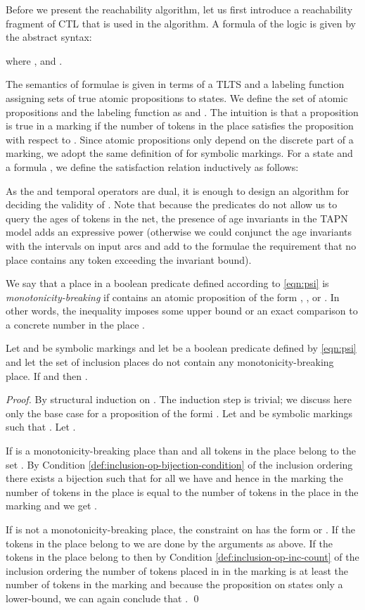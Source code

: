 Before we present the reachability algorithm, let us first introduce a reachability fragment of CTL that is used in the algorithm. A formula of the logic is given by the abstract syntax: 

where ,  and
.

The semantics of formulae is given in terms of a TLTS  and a labeling function  assigning sets of true atomic propositions to states. We define the set of atomic propositions  and the labeling function  as  and . The intuition is that a proposition  is true in a marking  if the number of tokens in the place  satisfies the proposition with respect to . Since atomic propositions only depend on the discrete part of a marking, we adopt the same definition of  for symbolic markings. For a state  and a formula , we define the satisfaction relation  inductively as follows:




As the  and  temporal operators are dual, it is enough to
design an algorithm for deciding the validity of .
Note that because the predicates do not allow us to query the ages
of tokens in the net, the presence of age invariants in the TAPN model
adds an expressive power (otherwise we could conjunct the age invariants
with the intervals on input arcs and add to the formulae the requirement that
no place contains any token exceeding the invariant bound).

We say that a place  in a boolean predicate 
defined according to \cref{eqn:psi} is \emph{monotonicity-breaking}
if  contains an atomic proposition of the form
, ,  or . In other words, the 
inequality imposes some upper bound or an exact comparison to a
concrete number in the place .

\begin{lemma}\label{lem:inc_empty_all_properties}
Let  and  be symbolic markings and let  be a boolean predicate 
defined by \cref{eqn:psi} and let
the set  of inclusion places do not contain any
monotonicity-breaking place. 
If  and  then .
\end{lemma}
\begin{proof}
By structural induction on . The induction step
is trivial; we discuss here only the base case for a proposition of the formi
.
Let  and  be symbolic markings 
such that .
Let . 

If  is a monotonicity-breaking place than 
and all tokens in the place  belong to the set .
By Condition \ref{def:inclusion-op-bijection-condition} of the inclusion
ordering
there exists a bijection  such that 
for all  
we have  and hence
in the marking 
the number of tokens in the place  is equal to the number
of tokens in the place  in the marking  and
we get .

If  is not a monotonicity-breaking place, the constraint on 
has the form  or .
If the tokens in the place  belong to 
we are done by the arguments as above.
If the tokens in the place  belong to 
then by Condition \ref{def:inclusion-op-inc-count}
of the inclusion ordering 
the number of tokens placed in  in the marking
 is at least the number of tokens in the marking 
 and because the proposition on  states only
a lower-bound, we can again conclude that .
\qed
\end{proof}



